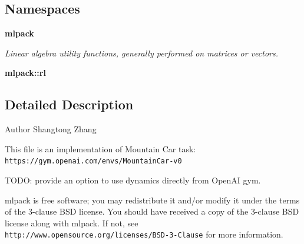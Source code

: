 \subsection*{Namespaces}
\begin{DoxyCompactItemize}
\item 
 \textbf{ mlpack}
\begin{DoxyCompactList}\small\item\em Linear algebra utility functions, generally performed on matrices or vectors. \end{DoxyCompactList}\item 
 \textbf{ mlpack\+::rl}
\end{DoxyCompactItemize}


\subsection{Detailed Description}
\begin{DoxyAuthor}{Author}
Shangtong Zhang
\end{DoxyAuthor}
This file is an implementation of Mountain Car task\+: {\tt https\+://gym.\+openai.\+com/envs/\+Mountain\+Car-\/v0}

T\+O\+DO\+: provide an option to use dynamics directly from Open\+AI gym.

mlpack is free software; you may redistribute it and/or modify it under the terms of the 3-\/clause B\+SD license. You should have received a copy of the 3-\/clause B\+SD license along with mlpack. If not, see {\tt http\+://www.\+opensource.\+org/licenses/\+B\+S\+D-\/3-\/\+Clause} for more information. 